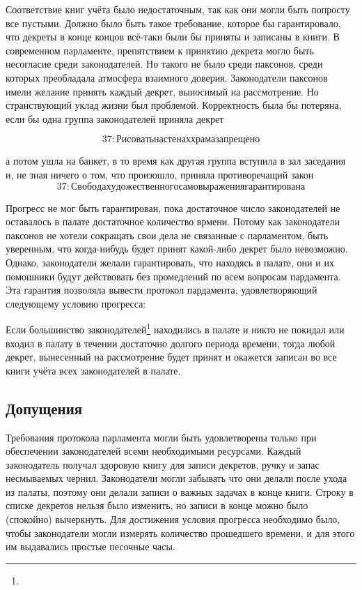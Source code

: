 Соответствие книг учёта было недостаточным, так как они могли быть попросту все пустыми. Должно было быть такое требование, которое бы гарантировало, что декреты в конце концов всё-таки были бы приняты и записаны в книги. В современном парламенте, препятствием к принятию декрета могло быть несогласие среди законодателей. Но такого не было среди паксонов, среди которых преобладала атмосфера взаимного доверия. Законодатели паксонов имели желание принять каждый декрет, выносимый на рассмотрение. Но странствующий уклад жизни был проблемой. Корректность была бы потеряна, если бы одна группа законодателей приняла декрет 

\[ 
    37: Рисовать на стенах храма запрещено 
\]

а потом ушла на банкет, в то время как другая группа вступила в зал заседания и, не зная ничего о том, что произошло, приняла противоречащий закон 
\[
    37: Свобода художественного самовыражения гарантирована 
\]

Прогресс не мог быть гарантирован, пока достаточное число законодателей не оставалось в палате достаточное количество врмени. Потому как законодатели паксонов не хотели сокращать свои дела не связанные с парламентом, быть уверенным, что когда-нибудь будет принят какой-либо декрет было невозможно. Однако, законодатели желали гарантировать, что находясь в палате, они и их помошники будут действовать без промедлений по всем вопросам пардамента. Эта гарантия позволяла вывести протокол пардамента, удовлетворяющий следующему условию прогресса:

    Если большинство законодателей\footnote{} находились в палате и никто не покидал или входил в палату в течении достаточно долгого периода времени, тогда любой декрет, вынесенный на рассмотрение будет принят и окажется записан во все книги учёта всех законодателей в палате.

\subsection{Допущения}

Требования протокола парламента могли быть удовлетворены только при обеспечении законодателей всеми необходимыми ресурсами. Каждый законодатель получал здоровую книгу для записи декретов, ручку и запас несмываемых чернил. Законодатели могли забывать что они делали после ухода из палаты, поэтому они делали записи о важных задачах в конце книги. Строку в списке декретов нельзя было изменить, но записи в конце можно было (спокойно) вычеркнуть. Для достижения условия прогресса необходимо было, чтобы законодатели могли измерять количество прошедшего времени, и для этого им выдавались простые песочные часы.

